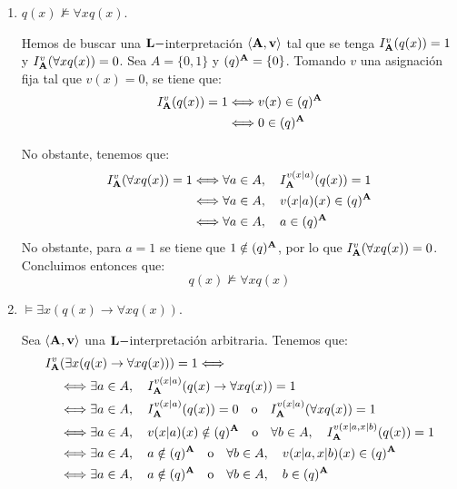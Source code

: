\begin{ejercicio}
\begin{enumerate}
        \item $q(x)\not\models \forall x q(x)$.
        
        Hemos de buscar una $\bf{L}-$interpretación $\langle \bf{A},v\rangle$ tal que se tenga $I_{\bf{A}}^v(q(x))=1$ y $I_{\bf{A}}^v(\forall x q(x))=0$.
        Sea $A=\{0,1\}$ y $(q)^{\bf{A}}=\{0\}$. Tomando $v$ una asignación fija tal que $v(x)=0$, se tiene que:
        \begin{align*}
            I_{\bf{A}}^v(q(x)) = 1
            & \Longleftrightarrow v(x)\in (q)^{\bf{A}}\\
            & \Longleftrightarrow 0\in (q)^{\bf{A}}
        \end{align*}

        No obstante, tenemos que:
        \begin{align*}
            I_{\bf{A}}^v(\forall x q(x)) = 1
            & \Longleftrightarrow \forall a\in A,\quad  I_{\bf{A}}^{v(x|a)}(q(x))=1\\
            & \Longleftrightarrow \forall a\in A,\quad  v(x|a)(x)\in (q)^{\bf{A}}\\
            & \Longleftrightarrow \forall a\in A,\quad  a\in (q)^{\bf{A}}
        \end{align*}
        No obstante, para $a=1$ se tiene que $1\notin (q)^{\bf{A}}$, por lo que $I_{\bf{A}}^v(\forall x q(x))=0$.
        Concluimos entonces que:
        \[q(x)\not\models \forall x q(x)\]

        \item $\models \exists x(q(x)\rightarrow \forall x q(x))$.
        
        Sea $\langle \bf{A},v\rangle$ una $\bf{L}-$interpretación arbitraria. Tenemos que:
        \begin{align*}
            I_{\bf{A}}^v&(\exists x(q(x)\rightarrow \forall x q(x))) = 1 \Longleftrightarrow \\
            & \Longleftrightarrow \exists a\in A,\quad  I_{\bf{A}}^{v(x|a)}(q(x)\rightarrow \forall x q(x))=1\\
            & \Longleftrightarrow \exists a\in A,\quad  I_{\bf{A}}^{v(x|a)}(q(x))=0 \quad\text{o}\quad I_{\bf{A}}^{v(x|a)}(\forall x q(x))=1\\
            & \Longleftrightarrow \exists a\in A,\quad  v(x|a)(x)\notin (q)^{\bf{A}} \quad\text{o}\quad \forall b\in A,\quad I_{\bf{A}}^{v(x|a,x|b)}(q(x))=1\\
            & \Longleftrightarrow \exists a\in A,\quad  a\notin (q)^{\bf{A}} \quad\text{o}\quad \forall b\in A,\quad v(x|a,x|b)(x)\in (q)^{\bf{A}} \\
            & \Longleftrightarrow \exists a\in A,\quad  a\notin (q)^{\bf{A}} \quad\text{o}\quad \forall b\in A,\quad b\in (q)^{\bf{A}}
        \end{align*}


\end{enumerate}
\end{ejercicio}
